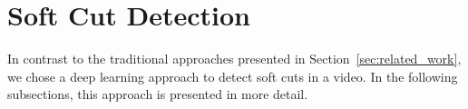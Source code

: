 \FloatBarrier
\section{Soft Cut Detection}
\label{sec:soft_cut}



%
%


In contrast to the traditional approaches presented in Section~\ref{sec:related_work}, we chose a deep learning approach to detect soft cuts in a video.
In the following subsections, this approach is presented in more detail.




